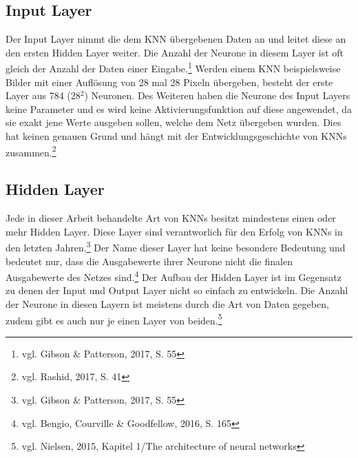 \documentclass[
	a4paper,
	12pt,
	ngerman,
	oneside
]{scrreprt}											%
\begin{document}
			\subsection{Input Layer}
				Der Input Layer nimmt die dem KNN übergebenen Daten an und leitet diese an den ersten Hidden Layer weiter. Die Anzahl der Neurone in diesem Layer ist oft gleich der Anzahl der Daten einer Eingabe.\footnote{vgl. Gibson \& Patterson, 2017, S. 55} Werden einem KNN beispielsweise Bilder mit einer Auflösung von 28 mal 28 Pixeln übergeben, besteht der erste Layer aus 784 (28$^2$) Neuronen. Des Weiteren haben die Neurone des Input Layers keine Parameter und es wird keine Aktivierungsfunktion auf diese angewendet, da sie exakt jene Werte ausgeben sollen, welche dem Netz übergeben wurden. Dies hat keinen genauen Grund und hängt mit der Entwicklungsgeschichte von KNNs zusammen.\footnote{vgl. Rashid, 2017, S. 41}
	
			\subsection{Hidden Layer}
				Jede in dieser Arbeit behandelte Art von KNNs besitzt mindestens einen oder mehr Hidden Layer. Diese Layer sind verantworlich für den Erfolg von KNNs in den letzten Jahren.\footnote{vgl. Gibson \& Patterson, 2017, S. 55} Der Name dieser Layer hat keine besondere Bedeutung und bedeutet nur, dass die Ausgabewerte ihrer Neurone nicht die finalen Ausgabewerte des Netzes sind.\footnote{vgl. Bengio, Courville \& Goodfellow, 2016, S. 165} Der Aufbau der Hidden Layer ist im Gegensatz zu denen der Input und Output Layer nicht so einfach zu entwickeln. Die Anzahl der Neurone in diesen Layern ist meistens durch die Art von Daten gegeben, zudem gibt es auch nur je einen Layer von beiden.\footnote{vgl. Nielsen, 2015, Kapitel 1/The architecture of neural networks}
				
\end{document}
